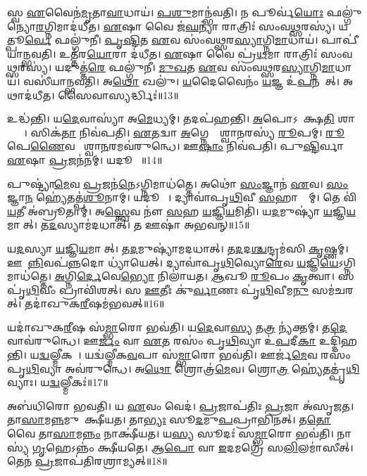 𑌸𑍍𑌵 \ul{𑌏}𑌵𑍈𑌨॑\ul{𑌮𑍃}𑌤𑌾\ul{𑌵𑌾}𑌧𑌾𑌯॑।
\ul{𑌪}\ul{𑌶𑍁}𑌮𑌾𑌨𑍍𑌭॑𑌵𑌤𑌿।
𑌨 𑌪𑍂𑌰𑍍𑌵॑\ul{𑌯𑍋𑌃} 𑌫𑌲𑍍𑌗𑍁॑𑌨𑍍𑌯𑍋\ul{𑌰}𑌗𑍍𑌨𑌿𑌮𑌾𑌦॑𑌧𑍀𑌤।
\ul{𑌏}𑌷𑌾 𑌵𑍈 𑌜॑\ul{𑌘}𑌨𑍍𑌯𑌾॑ 𑌰𑌾𑌤𑍍𑌰𑌿𑌃॑ 𑌸𑌂𑌵\ul{𑌥𑍍𑌸}𑌰𑌸𑍍𑌯॑।
𑌯𑌤𑍍𑌪𑍂\ul{𑌰𑍍𑌵𑍇} 𑌫𑌲𑍍𑌗𑍁॑𑌨𑍀।
\ul{𑌪𑍃}\ul{𑌷𑍍𑌟𑌿}𑌤 \ul{𑌏}𑌵 𑌸𑌂॑𑌵\ul{𑌥𑍍𑌸}𑌰\ul{𑌸𑍍𑌯𑌾}𑌗𑍍𑌨𑌿\ul{𑌮𑌾}𑌧𑌾𑌯॑।
𑌪𑌾𑌪𑍀॑𑌯𑌾𑌨𑍍𑌭𑌵𑌤𑌿।
𑌉𑌤𑍍𑌤॑𑌰\ul{𑌯𑍋}𑌰𑌾 𑌦॑𑌧𑍀𑌤।
\ul{𑌏}𑌷𑌾 𑌵𑍈 𑌪𑍍𑌰॑\ul{𑌥}𑌮𑌾 𑌰𑌾𑌤𑍍𑌰𑌿𑌃॑ 𑌸𑌂𑌵\ul{𑌥𑍍𑌸}𑌰𑌸𑍍𑌯॑।
𑌯𑌦𑍁𑌤𑍍𑌤॑\ul{𑌰𑍇} 𑌫𑌲𑍍𑌗𑍁॑𑌨𑍀।
\ul{𑌮𑍁}\ul{𑌖}𑌤 \ul{𑌏}𑌵 𑌸𑌂॑𑌵\ul{𑌥𑍍𑌸}𑌰\ul{𑌸𑍍𑌯𑌾}𑌗𑍍𑌨𑌿\ul{𑌮𑌾}𑌧𑌾𑌯॑।
𑌵𑌸𑍀॑𑌯𑌾𑌨𑍍𑌭𑌵𑌤𑌿।
𑌅\ul{𑌥𑍋} 𑌖𑌲𑍁॑।
\ul{𑌯}𑌦𑍈𑌵𑍈𑌨𑌂॑ \ul{𑌯}𑌜𑍍𑌞 𑌉॑\ul{𑌪}𑌨𑌮𑍇᳚𑌤𑍍।
𑌅𑌥𑌾𑌦॑𑌧𑍀𑌤।
𑌸𑍈𑌵𑌾𑌸𑍍𑌯𑌰𑍍𑌦𑍍𑌧𑌿𑌃॑॥13॥\anuvakamend[𑌖𑌲𑍍𑌵𑌾॑𑌧𑌿𑌥𑍍𑌸\ul{𑌨𑍍𑌤} 𑌫𑌲𑍍𑌗𑍁॑𑌨𑍍𑌯𑍋\ul{𑌰}𑌗𑍍𑌨𑌿𑌮𑌾𑌦॑𑌧𑍀𑌤𑌾𑌸𑌨𑍍𑌨𑌪𑌤𑌤𑌾𑌮𑍃\ul{𑌤𑍂}𑌨𑌾𑌂 𑌵𑍈𑌶𑍍𑌯॑\ul{𑌸𑍍𑌯}𑌰𑍍𑌤𑍁𑌰𑍁𑌤𑍍𑌤॑\ul{𑌰𑍇} 𑌫𑌲𑍍𑌗𑍁॑\ul{𑌨𑍀} 𑌷𑌟𑍍𑌚॑]

𑌉𑌦𑍍𑌧॑𑌨𑍍𑌤𑌿।
𑌯\ul{𑌦𑍇}𑌵𑌾𑌸𑍍𑌯𑌾॑ 𑌅\ul{𑌮𑍇}𑌧𑍍𑌯𑌮𑍍।
𑌤𑌦𑌪॑𑌹𑌨𑍍𑌤𑌿।
\ul{𑌅}𑌪𑍋𑌽𑌵𑍋᳚𑌕𑍍𑌷\ul{𑌤𑌿} 𑌶𑌾𑌨𑍍𑌤𑍍𑌯𑍈᳚।
𑌸𑌿𑌕॑\ul{𑌤𑌾} 𑌨𑌿𑌵॑𑌪𑌤𑌿।
\ul{𑌏}𑌤𑌦𑍍𑌵𑌾 \ul{𑌅}𑌗𑍍𑌨𑍇𑌰𑍍𑌵𑍈᳚𑌶𑍍𑌵𑌾\ul{𑌨}𑌰𑌸𑍍𑌯॑ \ul{𑌰𑍂}𑌪𑌮𑍍।
\ul{𑌰𑍂}𑌪𑍇\ul{𑌣𑍈}𑌵 𑌵𑍈᳚𑌶𑍍𑌵𑌾\ul{𑌨}𑌰𑌮𑌵॑𑌰𑍁𑌨𑍍𑌧𑍇।
𑌊\ul{𑌷𑌾𑌂} 𑌨𑌿𑌵॑𑌪𑌤𑌿।
𑌪𑍁\ul{𑌷𑍍𑌟𑌿}𑌰𑍍𑌵𑌾 \ul{𑌏}𑌷𑌾 \ul{𑌪𑍍𑌰}𑌜𑌨॑𑌨𑌮𑍍।
𑌯𑌦𑍂𑌷𑌾𑌃᳚॥14॥

𑌪𑍁𑌷𑍍𑌟𑍍𑌯𑌾॑\ul{𑌮𑍇}𑌵 \ul{𑌪𑍍𑌰}𑌜𑌨॑\ul{𑌨𑍇}\-𑌽𑌗𑍍𑌨𑌿𑌮𑌾𑌧॑𑌤𑍍𑌤𑍇।
𑌅𑌥𑍋॑ \ul{𑌸𑌂}𑌜𑍍𑌞𑌾𑌨॑ \ul{𑌏}𑌵।
\ul{𑌸𑌂}𑌜𑍍𑌞𑌾\ul{𑌨}\ul{} 𑌹𑍍𑌯𑍇॑𑌤𑌤𑍍𑌪॑\ul{𑌶𑍂}𑌨𑌾𑌮𑍍।
𑌯𑌦𑍂𑌷𑌾𑌃᳚।
𑌦𑍍𑌯𑌾𑌵𑌾॑𑌪𑍃\ul{𑌥𑌿}𑌵𑍀 \ul{𑌸}𑌹𑌾𑌸𑍍𑌤𑌾᳚𑌮𑍍।
𑌤𑍇 𑌵𑌿॑\ul{𑌯}𑌤𑍀 𑌅॑𑌬𑍍𑌰𑍂𑌤𑌾𑌮𑍍।
𑌅\ul{𑌸𑍍𑌤𑍍𑌵𑍇}𑌵 𑌨𑍗॑ \ul{𑌸}𑌹 \ul{𑌯}𑌜𑍍𑌞𑌿\ul{𑌯}𑌮𑌿𑌤𑌿॑।
𑌯\ul{𑌦}𑌮𑍁𑌷𑍍𑌯𑌾॑ \ul{𑌯}𑌜𑍍𑌞𑌿\ul{𑌯}𑌮𑌾𑌸𑍀᳚𑌤𑍍।
𑌤\ul{𑌦}𑌸𑍍𑌯𑌾𑌮॑𑌦𑌧𑌾𑌤𑍍।
𑌤 𑌊𑌷𑌾॑ 𑌅𑌭𑌵𑌨𑍍॥15॥

𑌯\ul{𑌦}𑌸𑍍𑌯𑌾 \ul{𑌯}𑌜𑍍𑌞𑌿\ul{𑌯}𑌮𑌾𑌸𑍀᳚𑌤𑍍।
𑌤\ul{𑌦}𑌮𑍁𑌷𑍍𑌯𑌾॑𑌮𑌦𑌧𑌾𑌤𑍍।
𑌤\ul{𑌦}𑌦\ul{𑌶𑍍𑌚}𑌨𑍍𑌦𑍍𑌰𑌮॑𑌸𑌿 \ul{𑌕𑍃}𑌷𑍍𑌣𑌮𑍍।
𑌊𑌷𑌾᳚\ul{𑌨𑍍𑌨𑌿}𑌵𑌪॑\ul{𑌨𑍍𑌨}𑌦𑍋 𑌧𑍍𑌯𑌾॑𑌯𑍇𑌤𑍍।
𑌦𑍍𑌯𑌾𑌵𑌾॑𑌪𑍃\ul{𑌥𑌿}𑌵𑍍𑌯𑍋\ul{𑌰𑍇}𑌵 \ul{𑌯}𑌜𑍍𑌞𑌿\ul{𑌯𑍇}\-𑌽𑌗𑍍𑌨𑌿𑌮𑌾𑌧॑𑌤𑍍𑌤𑍇।
\ul{𑌅}𑌗𑍍𑌨𑌿\ul{𑌰𑍍𑌦𑍇}𑌵𑍇\ul{𑌭𑍍𑌯𑍋} 𑌨𑌿𑌲𑌾॑𑌯𑌤।
\ul{𑌆}𑌖𑍂 \ul{𑌰𑍂}𑌪𑌂 \ul{𑌕𑍃}𑌤𑍍𑌵𑌾।
𑌸 𑌪𑍃॑\ul{𑌥𑌿}𑌵𑍀𑌂 𑌪𑍍𑌰𑌾𑌵𑌿॑𑌶𑌤𑍍।
𑌸 \ul{𑌊}𑌤𑍀𑌃 𑌕𑍁॑\ul{𑌰𑍍𑌵𑌾}𑌣𑌃 𑌪𑍃॑\ul{𑌥𑌿}𑌵𑍀𑌮\ul{𑌨𑍁} 𑌸𑌮॑𑌚𑌰𑌤𑍍।
𑌤𑌦𑌾॑𑌖𑍁𑌕\ul{𑌰𑍀}𑌷𑌮॑𑌭𑌵𑌤𑍍॥16॥

𑌯𑌦𑌾॑𑌖𑍁𑌕\ul{𑌰𑍀}𑌷 𑌸॑\ul{𑌮𑍍𑌭𑌾}𑌰𑍋 𑌭𑌵॑𑌤𑌿।
𑌯\ul{𑌦𑍇}𑌵𑌾\ul{𑌸𑍍𑌯} 𑌤\ul{𑌤𑍍𑌰} 𑌨𑍍𑌯॑𑌕𑍍𑌤𑌮𑍍।
𑌤\ul{𑌦𑍇}𑌵𑌾𑌵॑𑌰𑍁𑌨𑍍𑌧𑍇।
𑌊\ul{𑌰𑍍𑌜𑌂} 𑌵𑌾 \ul{𑌏}𑌤 𑌰𑌸𑌂॑ 𑌪𑍃\ul{𑌥𑌿}𑌵𑍍𑌯𑌾 𑌉॑\ul{𑌪}𑌦𑍀\ul{𑌕𑌾} 𑌉𑌦𑍍𑌦𑌿॑𑌹𑌨𑍍𑌤𑌿।
𑌯\ul{𑌦𑍍𑌵}𑌲𑍍𑌮𑍀𑌕𑌮𑍍᳚।
𑌯𑌦𑍍𑌵॑𑌲𑍍𑌮𑍀𑌕\ul{𑌵}𑌪𑌾 𑌸॑\ul{𑌮𑍍𑌭𑌾}𑌰𑍋 𑌭𑌵॑𑌤𑌿।
𑌊𑌰𑍍𑌜॑\ul{𑌮𑍇}𑌵 𑌰𑌸𑌂॑ 𑌪𑍃\ul{𑌥𑌿}𑌵𑍍𑌯𑌾 𑌅𑌵॑𑌰𑍁𑌨𑍍𑌧𑍇।
𑌅\ul{𑌥𑍋} 𑌶𑍍𑌰𑍋𑌤𑍍𑌰॑\ul{𑌮𑍇}𑌵।
𑌶𑍍𑌰𑍋\ul{𑌤𑍍𑌰}\ul{} 𑌹𑍍𑌯𑍇॑𑌤𑌤𑍍𑌪𑍃॑\ul{𑌥𑌿}𑌵𑍍𑌯𑌾𑌃।
𑌯\ul{𑌦𑍍𑌵}𑌲𑍍𑌮𑍀𑌕𑌃॑॥17॥

𑌅𑌬॑𑌧𑌿𑌰𑍋 𑌭𑌵𑌤𑌿।
𑌯 \ul{𑌏}𑌵𑌂 𑌵𑍇𑌦॑।
\ul{𑌪𑍍𑌰}𑌜𑌾𑌪॑𑌤𑌿𑌃 \ul{𑌪𑍍𑌰}𑌜𑌾 𑌅॑𑌸𑍃𑌜𑌤।
𑌤𑌾\ul{𑌸𑌾}𑌮\ul{𑌨𑍍𑌨}𑌮𑍁𑌪𑌾᳚𑌕𑍍𑌷𑍀𑌯𑌤।
𑌤𑌾\ul{𑌭𑍍𑌯𑌃} 𑌸𑍂\ul{𑌦}𑌮𑍁\ul{𑌪}𑌪𑍍𑌰𑌾𑌭𑌿॑𑌨𑌤𑍍।
𑌤\ul{𑌤𑍋} 𑌵𑍈 𑌤𑌾\ul{𑌸𑌾}𑌮\ul{𑌨𑍍𑌨𑌂} 𑌨𑌾𑌕𑍍𑌷𑍀॑𑌯𑌤।
𑌯\ul{𑌸𑍍𑌯} 𑌸𑍂𑌦𑌃॑ 𑌸\ul{𑌮𑍍𑌭𑌾}𑌰𑍋 𑌭𑌵॑𑌤𑌿।
𑌨𑌾𑌸𑍍𑌯॑ \ul{𑌗𑍃}𑌹𑍇𑌽𑌨𑍍𑌨𑌂॑ 𑌕𑍍𑌷𑍀𑌯𑌤𑍇।
𑌆\ul{𑌪𑍋} 𑌵𑌾 \ul{𑌇}𑌦𑌮𑌗𑍍𑌰𑍇॑ 𑌸\ul{𑌲𑌿}𑌲𑌮𑌾॑𑌸𑍀𑌤𑍍।
𑌤𑍇𑌨॑ \ul{𑌪𑍍𑌰}𑌜𑌾𑌪॑𑌤𑌿𑌰𑌶𑍍𑌰𑌾𑌮𑍍𑌯𑌤𑍍॥18॥

